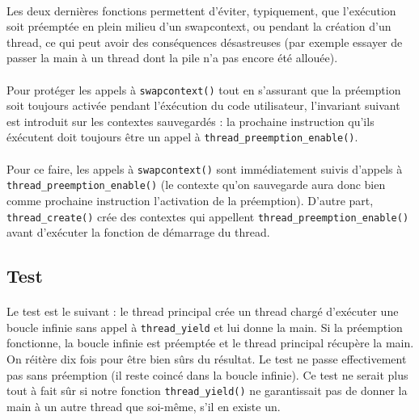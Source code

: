 \paragraph{}
Les deux dernières fonctions permettent d'éviter, typiquement, que l'exécution soit préemptée en plein milieu d'un swapcontext, ou pendant la création d'un thread, ce qui peut avoir des conséquences désastreuses (par exemple essayer de passer la main à un thread dont la pile n'a pas encore été allouée).

\paragraph{}
Pour protéger les appels à \texttt{swapcontext()} tout en s'assurant que la préemption soit toujours activée pendant l'éxécution du code utilisateur, l'invariant suivant est introduit sur les contextes sauvegardés : la prochaine instruction qu'ils éxécutent doit toujours être un appel à \texttt{thread\_preemption\_enable()}.

\paragraph{}
Pour ce faire, les appels à \texttt{swapcontext()} sont immédiatement suivis d'appels à \texttt{thread\_preemption\_enable()} (le contexte qu'on sauvegarde aura donc bien comme prochaine instruction l'activation de la préemption). D'autre part, \texttt{thread\_create()} crée des contextes qui appellent \texttt{thread\_preemption\_enable()} avant d'exécuter la fonction de démarrage du thread.

\subsection{Test}

\paragraph{}
Le test est le suivant : le thread principal crée un thread chargé d'exécuter une boucle infinie sans appel à \texttt{thread\_yield} et lui donne la main. Si la préemption fonctionne, la boucle infinie est préemptée et le thread principal récupère la main. On réitère dix fois pour être bien sûrs du résultat. Le test ne passe effectivement pas sans préemption (il reste coincé dans la boucle infinie). Ce test ne serait plus tout à fait sûr si notre fonction \texttt{thread\_yield()} ne garantissait pas de donner la main à un autre thread que soi-même, s'il en existe un.

